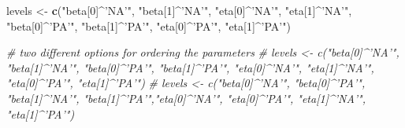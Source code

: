 \documentclass[]{article}
\newenvironment{Shaded}{\begin{snugshade}}{\end{snugshade}}
\newcommand{\CommentTok}[1]{\textcolor[rgb]{0.56,0.35,0.01}{\textit{#1}}}
\newcommand{\KeywordTok}[1]{\textcolor[rgb]{0.13,0.29,0.53}{\textbf{#1}}}
\newcommand{\NormalTok}[1]{#1}
\newcommand{\StringTok}[1]{\textcolor[rgb]{0.31,0.60,0.02}{#1}}
\begin{document}
\begin{Shaded}
\begin{Highlighting}[]
\NormalTok{levels <-}\StringTok{ }\KeywordTok{c}\NormalTok{(}\StringTok{"beta[0]^'NA'"}\NormalTok{, }\StringTok{"beta[1]^'NA'"}\NormalTok{, }\StringTok{"eta[0]^'NA'"}\NormalTok{, }\StringTok{"eta[1]^'NA'"}\NormalTok{,}
            \StringTok{"beta[0]^'PA'"}\NormalTok{, }\StringTok{"beta[1]^'PA'"}\NormalTok{, }\StringTok{"eta[0]^'PA'"}\NormalTok{, }\StringTok{"eta[1]^'PA'"}\NormalTok{)}

\CommentTok{# two different options for ordering the parameters}
\CommentTok{# levels <- c("beta[0]^'NA'", "beta[1]^'NA'", "beta[0]^'PA'", "beta[1]^'PA'", "eta[0]^'NA'", "eta[1]^'NA'", "eta[0]^'PA'", "eta[1]^'PA'")}
\CommentTok{# levels <- c("beta[0]^'NA'", "beta[0]^'PA'", "beta[1]^'NA'", "beta[1]^'PA'","eta[0]^'NA'", "eta[0]^'PA'", "eta[1]^'NA'", "eta[1]^'PA'")}


\end{Highlighting}
\end{Shaded}
\end{document}
